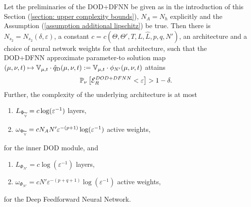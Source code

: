 \begin{theorem} \label{theo: PAC bound for DOD+DFNN}
    Let the preliminaries of the DOD+DFNN be given as in the introduction of this Section 
    (\ref{section: upper complexity bounds}), $N_A = N_h$ explicitly and the Assumption 
    (\ref{assumption additional lipschitz}) be true.
    Then there is $N_{s_2} = N_{s_2}(\delta, \varepsilon)$, 
    a constant $c = c(\Theta, \Theta', T, L, \hat{L}, p, q, N')$,
    an architecture and a choice of neural network weights for that architecture, such that
    the DOD+DFNN approximate parameter-to solution map $(\mu, \nu, t) \mapsto 
    \mathbb{V}_{\mu, t} \cdot \hat{q}_\text{D}(\mu, \nu, t) :=
    \mathbb{V}_{\mu, t} \cdot \phi_{N'}(\mu, \nu, t)$ 
    attains
    \begin{equation*}
        \mathbb{P}_\nu\left[\mathcal{E}^{DOD+DFNN}_R < \varepsilon\right] > 1 - \delta.
    \end{equation*}
    Further, the complexity of the underlying architecture is at most
    \begin{enumerate}
        \item[-] $L_{\Phi_{\widetilde{\mathbb{V}}}} = c \log(\varepsilon^{-1})$ layers,
        \item[-] $\omega_{\Phi_{\widetilde{\mathbb{V}}}} = cN_A N' \varepsilon^{-(p+1)} \log(\varepsilon^{-1})$ active weights,
    \end{enumerate}
    for the inner DOD module, and
    \begin{enumerate}
        \item[-] $L_{\Phi_{N'}} = c \log(\varepsilon^{-1})$ layers,
        \item[-] $\omega_{\Phi_{N'}} = c N' \varepsilon^{-(p+q+1)} \log(\varepsilon^{-1})$ active weights,
    \end{enumerate}
    for the Deep Feedforward Neural Network.
\end{theorem}
